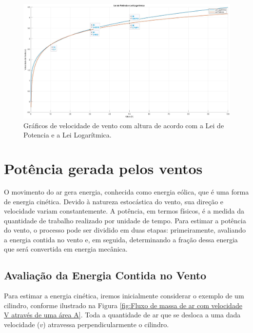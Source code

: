         \begin{figure}[H]
            \caption{Gráficos de velocidade de vento com altura de acordo com a Lei de Potencia e a Lei Logarítmica.}
            \label{fig:Ganho em Altura}
            \centering
            \includegraphics[width=1\textwidth]{Figuras/Teorico/Lei da Potencia e Lei Logaritmica.jpg}
            
        \end{figure}
        
        
        \section{Potência gerada pelos ventos}
        \par O movimento do ar gera energia, conhecida como energia eólica, que é uma forma de energia cinética. Devido à natureza estocástica do vento, sua direção e velocidade variam constantemente. A potência, em termos físicos, é a medida da quantidade de trabalho realizado por unidade de tempo. Para estimar a potência do vento, o processo pode ser dividido em duas etapas: primeiramente, avaliando a energia contida no vento e, em seguida, determinando a fração dessa energia que será convertida em energia mecânica.

        \subsection{Avaliação da Energia Contida no Vento}
        
        Para estimar a energia cinética, iremos inicialmente considerar o exemplo de um cilindro, conforme ilustrado na Figura \ref{fig:Fluxo de massa de ar com velocidade V através de uma área A}. Toda a quantidade de ar que se desloca a uma dada velocidade ($v$) atravessa perpendicularmente o cilindro. 

